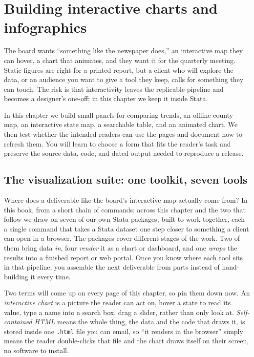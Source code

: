 \chapter{Building interactive charts and infographics}\label{ch:interactive}

The board wants \enquote{something like the newspaper does,} an interactive map they can hover, a chart that animates, and they want it for the quarterly meeting. Static figures are right for a printed report, but a client who will explore the data, or an audience you want to give a tool they keep, calls for something they can touch. The risk is that interactivity leaves the replicable pipeline and becomes a designer's one-off; in this chapter we keep it inside Stata.

In this chapter we build small panels for comparing trends, an offline county map, an interactive state map, a searchable table, and an animated chart. We then test whether the intended readers can use the pages and document how to refresh them. You will learn to choose a form that fits the reader's task and preserve the source data, code, and dated output needed to reproduce a release.

\section{The visualization suite: one toolkit, seven tools}\label{sec:suite}
Where does a deliverable like the board's interactive map actually come from? In this book, from a short chain of commands: across this chapter and the two that follow we draw on seven of our own Stata packages, built to work together, each a single command that takes a Stata dataset one step closer to something a client can open in a browser. The packages cover different stages of the work. Two of them bring data \emph{in}, four \emph{render} it as a chart or dashboard, and one \emph{wraps} the results into a finished report or web portal. Once you know where each tool sits in that pipeline, you assemble the next deliverable from parts instead of hand-building it every time.

Two terms will come up on every page of this chapter, so pin them down now. An \emph{interactive chart} is a picture the reader can act on, hover a state to read its value, type a name into a search box, drag a slider, rather than only look at. \emph{Self-contained HTML} means the whole thing, the data and the code that draws it, is stored inside one \texttt{.html} file you can email, so \enquote{it renders in the browser} simply means the reader double-clicks that file and the chart draws itself on their screen, no software to install.

